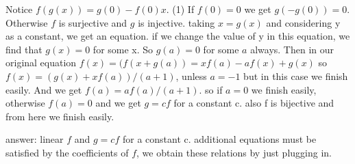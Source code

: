 \begin{mysolution}
	Notice $f(g(x))=g(0)-f(0)x$. (1)
If $f(0)=0$ we get $g(-g(0))=0$.
Otherwise $f$ is surjective and $g$ is injective. taking $x=g(x)$ and considering y as a constant, we get an equation. if we change the value of y in this equation, we find that $g(x)=0$ for some x. So $g(a)=0$ for some $a$ always.
Then in our original equation $f(x)=(f(x+g(a))=xf(a)-af(x)+g(x)$ so $f(x)=(g(x)+xf(a))/(a+1)$, unless $a=-1$ but in this case we finish easily. And we get $f(a)=af(a)/(a+1)$. so if $a=0$ we finish easily, otherwise $f(a)=0$ and we get $g=cf$ for a constant c. also f is bijective and from here we finish easily.

answer: linear $f$ and $g=cf$ for a constant c. additional equations must be satisfied by the coefficients of $f$, we obtain these relations by just plugging in.
\end{mysolution}



